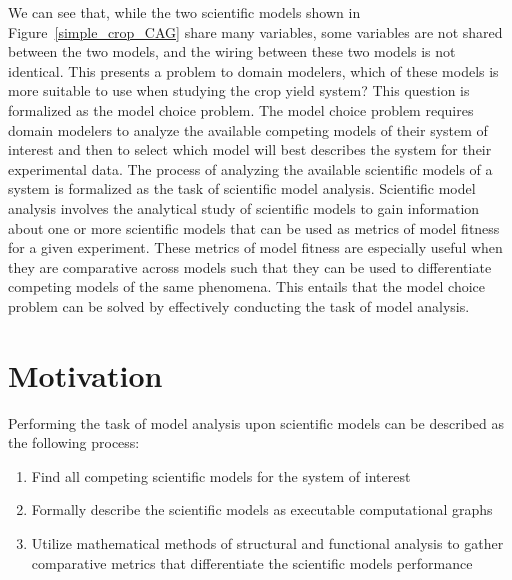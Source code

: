 We can see that, while the two scientific models shown in Figure~\ref{simple_crop_CAG} share many variables, some variables are not shared between the two models, and the wiring between these two models is not identical.
This presents a problem to domain modelers, which of these models is more suitable to use when studying the crop yield system?
This question is formalized as the model choice problem.
The model choice problem requires domain modelers to analyze the available competing models of their system of interest and then to select which model will best describes the system for their experimental data.
The process of analyzing the available scientific models of a system is formalized as the task of scientific model analysis.
Scientific model analysis involves the analytical study of scientific models to gain information about one or more scientific models that can be used as metrics of model fitness for a given experiment.
These metrics of model fitness are especially useful when they are comparative across models such that they can be used to differentiate competing models of the same phenomena.
This entails that the model choice problem can be solved by effectively conducting the task of model analysis.


\section{Motivation\label{sec:motivation}}
Performing the task of model analysis upon scientific models can be described as the following process:
\begin{enumerate}
  \item Find all competing scientific models for the system of interest
  \item Formally describe the scientific models as executable computational graphs
  \item Utilize mathematical methods of structural and functional analysis to gather comparative metrics that differentiate the scientific models performance
\end{enumerate}

